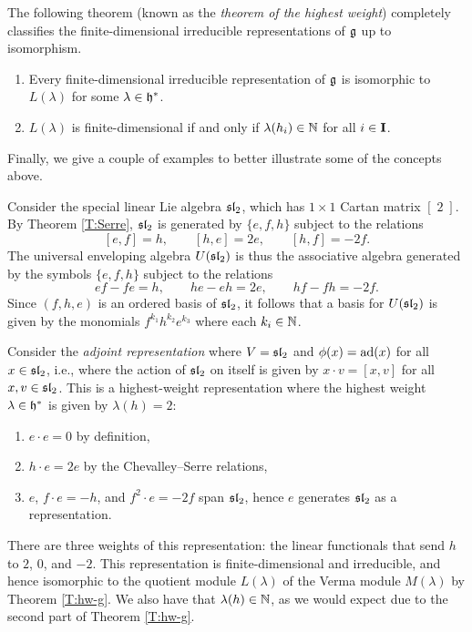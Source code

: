 The following theorem (known as the \emph{theorem of the highest weight}) completely classifies the finite-dimensional irreducible representations of $\mathfrak{g}$ up to isomorphism.

\begin{theorem}\label{T:hw-g}
    \begin{enumerate}
        \item Every finite-dimensional irreducible representation of $\mathfrak{g}$ is isomorphic to $L(\lambda)$ for some $\lambda\in\mathfrak{h}^*$.
        \item $L(\lambda)$ is finite-dimensional if and only if $\lambda(h_i)\in\mathbb{N}$ for all $i\in\mathbf{I}$.
    \end{enumerate}
\end{theorem}

Finally, we give a couple of examples to better illustrate some of the concepts above.

\begin{example}\label{E:sl2-ad}
    Consider the special linear Lie algebra $\mathfrak{sl}_2$, which has $1\times 1$ Cartan matrix $[\;2\;]$.
    By Theorem \ref{T:Serre}, $\mathfrak{sl}_2$ is generated by $\{e,f,h\}$ subject to the relations
    \[[e,f]=h, \qquad [h,e]=2e, \qquad [h,f]=-2f.\]
    The universal enveloping algebra $U(\mathfrak{sl}_2)$ is thus the associative algebra generated by the symbols $\{e,f,h\}$ subject to the relations
    \[ef-fe=h, \qquad he-eh=2e, \qquad hf-fh=-2f.\]
    Since $(f,h,e)$ is an ordered basis of $\mathfrak{sl}_2$, it follows that a basis for $U(\mathfrak{sl}_2)$ is given by the monomials $f^{k_1}h^{k_2}e^{k_3}$ where each $k_i\in\mathbb{N}$.

    Consider the \emph{adjoint representation} where $V=\mathfrak{sl}_2$ and $\phi(x)=\operatorname{ad}(x)$ for all $x\in\mathfrak{sl}_2$, i.e., where the action of $\mathfrak{sl}_2$ on itself is given by $x\cdot v=[x,v]$ for all $x,v\in\mathfrak{sl}_2$.
    This is a highest-weight representation where the highest weight $\lambda\in\mathfrak{h}^*$ is given by $\lambda(h)=2$:
    \begin{enumerate}
        \item $e\cdot e = 0$ by definition,
        \item $h\cdot e = 2e$ by the Chevalley--Serre relations,
        \item $e$, $f\cdot e = -h$, and $f^2\cdot e = -2f$ span $\mathfrak{sl}_2$, hence $e$ generates $\mathfrak{sl}_2$ as a representation.
    \end{enumerate}
    There are three weights of this representation: the linear functionals that send $h$ to $2$, $0$, and $-2$.
    This representation is finite-dimensional and irreducible, and hence isomorphic to the quotient module $L(\lambda)$ of the Verma module $M(\lambda)$ by Theorem \ref{T:hw-g}.
    We also have that $\lambda(h)\in\mathbb{N}$, as we would expect due to the second part of Theorem \ref{T:hw-g}.
\end{example}

